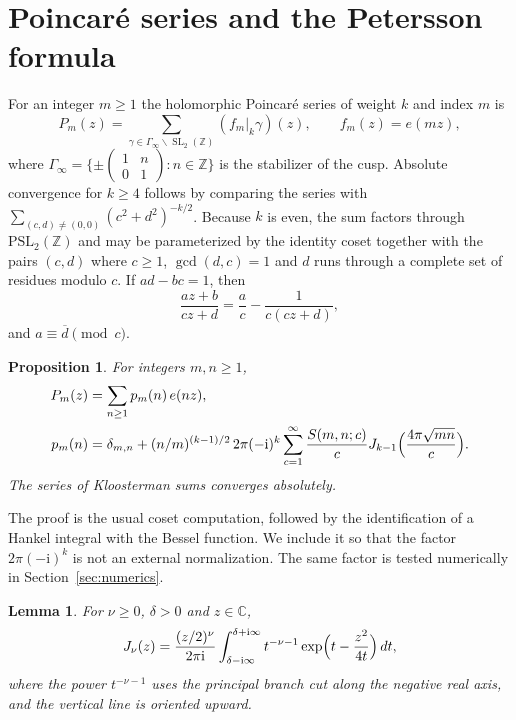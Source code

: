 \documentclass[11pt]{amsart}
\newtheorem{lemma}[theorem]{Lemma}
\newtheorem{proposition}[theorem]{Proposition}
\theoremstyle{definition}
\theoremstyle{remark}
\numberwithin{equation}{section}
\DeclareMathOperator{\SL}{SL}
\newcommand{\CC}{\mathbb{C}}
\newcommand{\ZZ}{\mathbb{Z}}
\newcommand{\ii}{\mathrm{i}}
\begin{document}
\section{Poincar\'e series and the Petersson formula}
\label{sec:petersson}

For an integer $m\ge 1$ the holomorphic Poincar\'e series of weight $k$ and index $m$ is
\begin{equation}\label{eq:poincare}
P_m(z)
=\sum_{\gamma\in\Gamma_\infty\backslash\SL_2(\ZZ)}(f_m|_k\gamma)(z),
\qquad f_m(z)=e(mz),
\end{equation}
where $\Gamma_\infty=\{\pm\begin{pmatrix}1&n\\0&1\end{pmatrix}:n\in\ZZ\}$ is the stabilizer of the cusp. Absolute convergence for $k\ge 4$ follows by comparing the series with $\sum_{(c,d)\neq(0,0)}(c^2+d^2)^{-k/2}$. Because $k$ is even, the sum factors through $\mathrm{PSL}_2(\ZZ)$ and may be parameterized by the identity coset together with the pairs $(c,d)$ where $c\ge 1$, $\gcd(d,c)=1$ and $d$ runs through a complete set of residues modulo $c$. If $ad-bc=1$, then
\begin{equation}\label{eq:mobius-identity}
\frac{az+b}{cz+d}=\frac ac-\frac{1}{c(cz+d)},
\end{equation}
and $a\equiv\overline d\pmod c$.

\begin{proposition}\label{prop:poincare-fourier}
For integers $m,n\ge 1$,
\begin{equation}\label{eq:poincare-coeff}
\begin{aligned}
P_m(z)
&=\sum_{n\ge 1}p_m(n)\,e(nz),\\
p_m(n)
&=\delta_{m,n}
+(n/m)^{(k-1)/2}\,2\pi(-\ii)^k
\sum_{c=1}^\infty\frac{S(m,n;c)}{c}
J_{k-1}\Bigl(\frac{4\pi\sqrt{mn}}{c}\Bigr).
\end{aligned}
\end{equation}
The series of Kloosterman sums converges absolutely.
\end{proposition}

The proof is the usual coset computation, followed by the identification of a Hankel integral with the Bessel function. We include it so that the factor $2\pi(-\ii)^k$ is not an external normalization. The same factor is tested numerically in Section~\ref{sec:numerics}.

\begin{lemma}\label{lem:bessel-hankel}
For $\nu\ge 0$, $\delta>0$ and $z\in\CC$,
\begin{equation}\label{eq:hankel}
J_\nu(z)
=\frac{(z/2)^\nu}{2\pi\ii}
\int_{\delta-\ii\infty}^{\delta+\ii\infty}
t^{-\nu-1}\exp\Bigl(t-\frac{z^2}{4t}\Bigr)\,dt,
\end{equation}
where the power $t^{-\nu-1}$ uses the principal branch cut along the negative real axis, and the vertical line is oriented upward.
\end{lemma}
\end{document}
